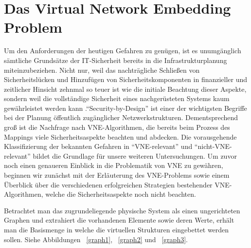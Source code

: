 \documentclass{lni}
\begin{document}
\section{Das Virtual Network Embedding Problem}
\label{sec:VNE-Problem}
Um den Anforderungen der heutigen Gefahren zu genügen, ist es unumgänglich sämtliche Grundsätze der IT-Sicherheit bereits in die Infrastrukturplanung miteinzubeziehen. Nicht nur, weil das nachträgliche Schließen von Sicherheitslücken und Hinzufügen von Sicherheitskomponenten in finanzieller und zeitlicher Hinsicht zehnmal so teuer ist wie die initiale Beachtung dieser Aspekte, sondern weil die vollständige Sicherheit eines nachgerüsteten Systems kaum gewährleistet werden kann \cite{Cole}."`Security-by-Design"' ist einer der wichtigsten Begriffe bei der Planung öffentlich zugänglicher Netzwerkstrukturen. Dementsprechend groß ist die Nachfrage nach VNE-Algorithmen, die bereits beim Prozess des Mappings viele Sicherheitsaspekte beachten und abdecken. Die vorausgehende Klassifizierung der bekannten Gefahren in "`VNE-relevant"' und "`nicht-VNE-relevant"' bildet die Grundlage für unsere weiteren Untersuchungen. Um zuvor noch einen genaueren Einblick in die Problematik von VNE zu gewähren, beginnen wir zunächst mit der Erläuterung des VNE-Problems sowie einem Überblick über die verschiedenen erfolgreichen Strategien bestehender VNE-Algorithmen, welche die Sicherheitsaspekte noch nicht beachten. 

Betrachtet man das zugrundeliegende physische System als einen ungerichteten Graphen und extrahiert die vorhandenen Elemente sowie deren Werte, erhält man die Basismenge in welche die virtuellen Strukturen eingebettet werden sollen. Siehe Abbildungen ~\ref{graph1}, ~\ref{graph2} und ~\ref{graph3}.
\end{document}
